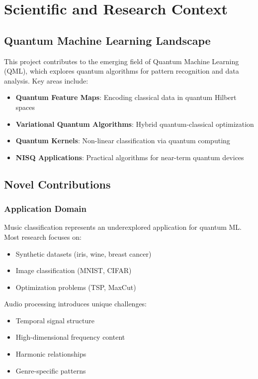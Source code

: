 \documentclass[11pt,a4paper]{article}
\begin{document}
\section{Scientific and Research Context}

\subsection{Quantum Machine Learning Landscape}

This project contributes to the emerging field of Quantum Machine Learning (QML), which explores quantum algorithms for pattern recognition and data analysis. Key areas include:

\begin{itemize}
    \item \textbf{Quantum Feature Maps}: Encoding classical data in quantum Hilbert spaces
    \item \textbf{Variational Quantum Algorithms}: Hybrid quantum-classical optimization
    \item \textbf{Quantum Kernels}: Non-linear classification via quantum computing
    \item \textbf{NISQ Applications}: Practical algorithms for near-term quantum devices
\end{itemize}

\subsection{Novel Contributions}

\subsubsection{Application Domain}
Music classification represents an underexplored application for quantum ML. Most research focuses on:
\begin{itemize}
    \item Synthetic datasets (iris, wine, breast cancer)
    \item Image classification (MNIST, CIFAR)
    \item Optimization problems (TSP, MaxCut)
\end{itemize}

Audio processing introduces unique challenges:
\begin{itemize}
    \item Temporal signal structure
    \item High-dimensional frequency content  
    \item Harmonic relationships
    \item Genre-specific patterns
\end{itemize}
\end{document}
